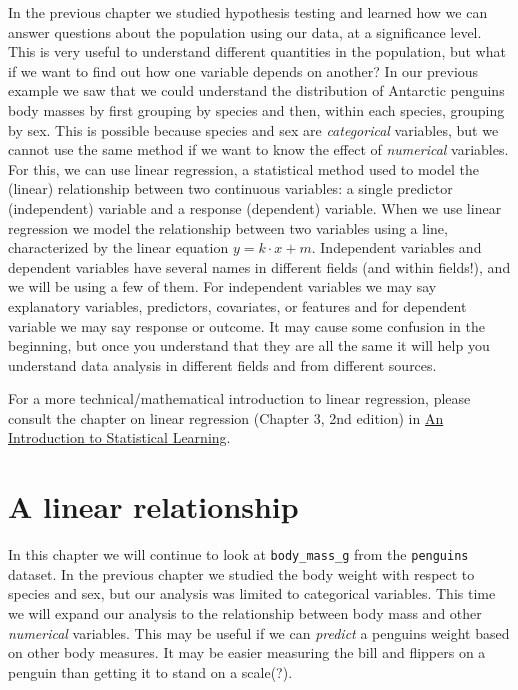 \documentclass[
  letterpaper,
  DIV=11,
  numbers=noendperiod]{scrreprt}
\begin{document}
In the previous chapter we studied hypothesis testing and learned how we
can answer questions about the population using our data, at a
significance level. This is very useful to understand different
quantities in the population, but what if we want to find out how one
variable depends on another? In our previous example we saw that we
could understand the distribution of Antarctic penguins body masses by
first grouping by species and then, within each species, grouping by
sex. This is possible because species and sex are \emph{categorical}
variables, but we cannot use the same method if we want to know the
effect of \emph{numerical} variables. For this, we can use linear
regression, a statistical method used to model the (linear) relationship
between two continuous variables: a single predictor (independent)
variable and a response (dependent) variable. When we use linear
regression we model the relationship between two variables using a line,
characterized by the linear equation \(y = k \cdot x + m\). Independent
variables and dependent variables have several names in different fields
(and within fields!), and we will be using a few of them. For
independent variables we may say explanatory variables, predictors,
covariates, or features and for dependent variable we may say response
or outcome. It may cause some confusion in the beginning, but once you
understand that they are all the same it will help you understand data
analysis in different fields and from different sources.

For a more technical/mathematical introduction to linear regression,
please consult the chapter on linear regression (Chapter 3, 2nd edition)
in \href{https://www.statlearning.com/}{An Introduction to Statistical
Learning}.

\section{A linear relationship}\label{a-linear-relationship}

In this chapter we will continue to look at \texttt{body\_mass\_g} from
the \texttt{penguins} dataset. In the previous chapter we studied the
body weight with respect to species and sex, but our analysis was
limited to categorical variables. This time we will expand our analysis
to the relationship between body mass and other \emph{numerical}
variables. This may be useful if we can \emph{predict} a penguins weight
based on other body measures. It may be easier measuring the bill and
flippers on a penguin than getting it to stand on a scale(?).
\end{document}
